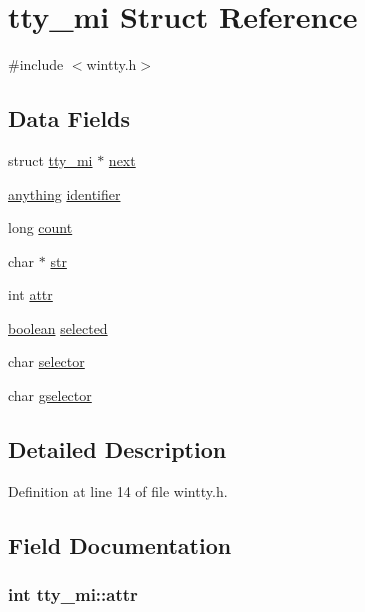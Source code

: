 \hypertarget{structtty__mi}{\section{tty\+\_\+mi Struct Reference}
\label{structtty__mi}
}


{\ttfamily \#include $<$wintty.\+h$>$}

\subsection*{Data Fields}
\begin{DoxyCompactItemize}
\item 
struct \hyperlink{structtty__mi}{tty\+\_\+mi} $\ast$ \hyperlink{structtty__mi_ab763b4b48357a342043b32abf63c454b}{next}
\item 
\hyperlink{wintype_8h_a49720928e6af182ee38aa332d0483b2a}{anything} \hyperlink{structtty__mi_a73099194426e697aef211859b69021d2}{identifier}
\item 
long \hyperlink{structtty__mi_a9648bba19b3f98fe6d3ea2de7852a479}{count}
\item 
char $\ast$ \hyperlink{structtty__mi_a6c3b20ea2e4c180b6f2ab89fe2d0b72d}{str}
\item 
int \hyperlink{structtty__mi_ad48065aba415dc39217c539384b04ba9}{attr}
\item 
\hyperlink{global_8h_a531b10dd351aa162d7dcccd1966308b8}{boolean} \hyperlink{structtty__mi_ab5378e677355a69672c9ef4145e315a6}{selected}
\item 
char \hyperlink{structtty__mi_ade30fd7b68efae0b39e6674408958d1a}{selector}
\item 
char \hyperlink{structtty__mi_a64098b2f798516056e20fd294aca0789}{gselector}
\end{DoxyCompactItemize}


\subsection{Detailed Description}


Definition at line 14 of file wintty.\+h.



\subsection{Field Documentation}
\hypertarget{structtty__mi_ad48065aba415dc39217c539384b04ba9}{
\subsubsection[{attr}]{\setlength{\rightskip}{0pt plus 5cm}int tty\+\_\+mi\+::attr}}\label{structtty__mi_ad48065aba415dc39217c539384b04ba9}


